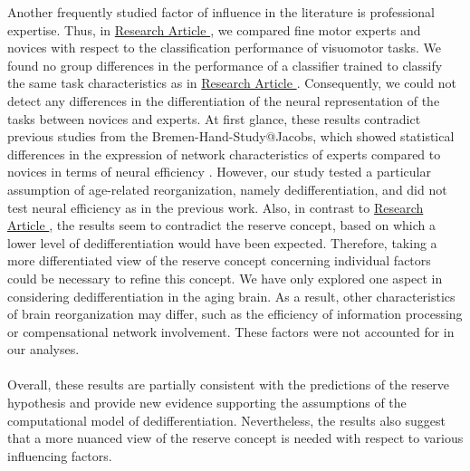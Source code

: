Another frequently studied factor of influence in the literature is professional expertise. Thus, in \hyperref[results:paperIV]{Research Article }, we compared fine motor experts and novices with respect to the classification performance of visuomotor tasks. We found no group differences in the performance of a classifier trained to classify the same task characteristics as in \hyperref[results:paperI]{Research Article }. Consequently, we could not detect any differences in the differentiation of the neural representation of the tasks between novices and experts. At first glance, these results contradict previous studies from the Bremen-Hand-Study@Jacobs, which showed statistical differences in the expression of network characteristics of experts compared to novices in terms of neural efficiency \cite{Goelz2018, Vieluf2018}. However, our study tested a particular assumption of age-related reorganization, namely dedifferentiation, and did not test neural efficiency as in the previous work. Also, in contrast to \hyperref[results:paperIII]{Research Article }, the results seem to contradict the reserve concept, based on which a lower level of dedifferentiation would have been expected. Therefore, taking a more differentiated view of the reserve concept concerning individual factors could be necessary to refine this concept. We have only explored one aspect in considering dedifferentiation in the aging brain. As a result, other characteristics of brain reorganization may differ, such as the efficiency of information processing or compensational network involvement. These factors were not accounted for in our analyses.\\
\\
Overall, these results are partially consistent with the predictions of the reserve hypothesis and provide new evidence supporting the assumptions of the computational model of dedifferentiation. Nevertheless, the results also suggest that a more nuanced view of the reserve concept is needed with respect to various influencing factors.

